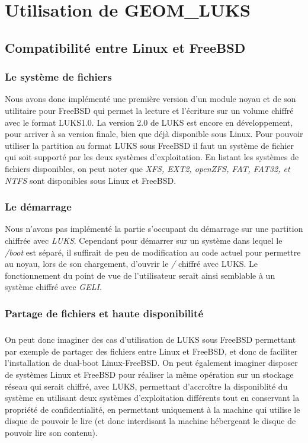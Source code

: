 \chapter{Utilisation de GEOM\_LUKS}

\section{Compatibilité entre Linux et FreeBSD}

\subsection{Le système de fichiers}
Nous avons donc implémenté une première version d'un module noyau et de son
utilitaire pour FreeBSD qui permet la lecture et l'écriture sur un volume chiffré
avec le format LUKS1.0. La version 2.0 de LUKS est encore en développement,
pour arriver à sa version finale, bien que déjà disponible sous Linux. Pour
pouvoir utiliser la partition au format LUKS sous FreeBSD il faut un système de
fichier qui soit supporté par les deux systèmes d'exploitation. En listant
les systèmes de fichiers disponibles, on peut noter que {\em XFS, EXT2, openZFS,
FAT, FAT32, et NTFS} sont disponibles sous Linux et FreeBSD.

\subsection{Le démarrage}
Nous n'avons pas implémenté la partie s'occupant du démarrage sur une partition
chiffrée avec {\em LUKS}. Cependant pour démarrer sur un système dans lequel le
{\em /boot} est séparé, il suffirait de peu de modification au code actuel pour
permettre au noyau, lors de son chargement, d'ouvrir le {\em /} chiffré avec
LUKS. Le fonctionnement du point de vue de l'utilisateur serait ainsi semblable
à un système chiffré avec \textit{GELI}.

\subsection{Partage de fichiers et haute disponibilité}
\paragraph{}
On peut donc imaginer des cas d'utilisation de LUKS sous FreeBSD permettant par
exemple de partager des fichiers entre Linux et FreeBSD, et donc de faciliter
l'installation de dual-boot Linux-FreeBSD. On peut également imaginer disposer
de systèmes Linux et FreeBSD pour réaliser la même opération sur un stockage
réseau qui serait chiffré, avec LUKS, permettant d'accroître la disponiblité du
système en utilisant deux systèmes d'exploitation différents tout en conservant
la propriété de confidentialité, en permettant uniquement à la machine qui
utilise le disque de pouvoir le lire (et donc interdisant la machine hébergeant
le disque de pouvoir lire son contenu).
